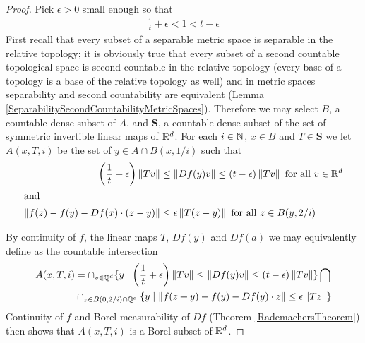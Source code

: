 \begin{proof}
Pick $\epsilon >0$ small enough so that 
\begin{align*}
\frac{1}{t} + \epsilon < 1 < t - \epsilon
\end{align*}
First recall that every subset of a separable metric space is separable in the relative topology; it is obviously true that every subset of a second countable topological space is second countable in the relative topology (every base of a topology is a base of the relative topology as well) and in metric spaces separability and second countability are equivalent (Lemma \ref{SeparabilitySecondCountabilityMetricSpaces}).  Therefore we may 
select $B$, a countable dense subset of $A$, and $\mathbf{S}$, a countable dense subset of the set of symmetric invertible linear maps of $\mathbb{R}^d$.  For each $i \in \mathbb{N}$, $x \in B$ and $T \in \mathbf{S}$ we let $A(x,T,i)$ be the set of $y \in A \cap B(x, 1/i)$ such that
\begin{align*}
\left( \frac{1}{t} + \epsilon \right) \left \lVert Tv \right \rVert &\leq \left \lVert Df(y) v \right \rVert \leq (t-\epsilon)\left \lVert Tv \right \rVert \text{ for all $v \in \mathbb{R}^d$} \\
\intertext{and}
\left \lVert f(z) - f(y) - Df(x) \cdot (z-y) \right \rVert &\leq \epsilon \left \lVert T(z-y) \right \rVert \text{ for all $z \in B(y, 2/i)$}
\end{align*}

By continuity of $f$, the linear maps $T$, $Df(y)$ and $Df(a)$ we may equivalently define as the countable intersection
\begin{align*}
A(x,T,i) &= \cap_{v \in \mathbb{Q}^d} \lbrace y \mid \left( \frac{1}{t} + \epsilon \right) \left \lVert Tv \right \rVert \leq \left \lVert Df(y) v \right \rVert \leq (t-\epsilon)\left \lVert Tv \right \rVert \rbrace \bigcap \\
&\cap_{z \in B(0, 2/i) \cap \mathbb{Q}^d} \lbrace y \mid \left \lVert f(z+y) - f(y) - Df(y) \cdot z \right \rVert \leq \epsilon \left \lVert Tz \right \rVert \rbrace 
\end{align*}
Continuity of $f$ and Borel measurability of $Df$ (Theorem \ref{RademachersTheorem}) then shows that $A(x,T,i)$ is a Borel subset of $\mathbb{R}^d$.


\end{proof}
